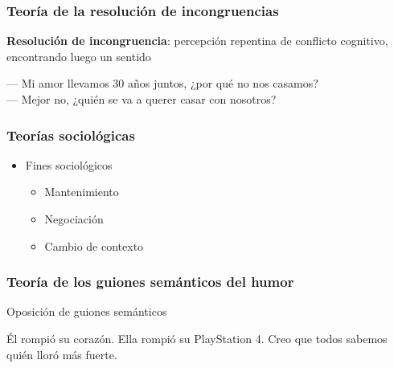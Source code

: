 \begin{frame}
    \frametitle{Teoría de la resolución de incongruencias}

    \textbf{Resolución de incongruencia}: percepción repentina de conflicto cognitivo, encontrando luego un sentido
    \begin{example}
        --- Mi amor llevamos 30 años juntos, ¿por qué no nos casamos? \\
        --- Mejor no, ¿quién se va a querer casar con nosotros?
    \end{example}
\end{frame}

\begin{frame}
    \frametitle{Teorías sociológicas}

    \begin{itemize}
        \item Fines sociológicos

        \begin{itemize}
            \item Mantenimiento
            \item Negociación
            \item Cambio de contexto
        \end{itemize}
    \end{itemize}
\end{frame}

\begin{frame}
    \frametitle{Teoría de los guiones semánticos del humor}

    Oposición de guiones semánticos

    \begin{example}
        Él rompió su corazón. Ella rompió su PlayStation 4. Creo que todos sabemos quién lloró más fuerte.
    \end{example}
\end{frame}

